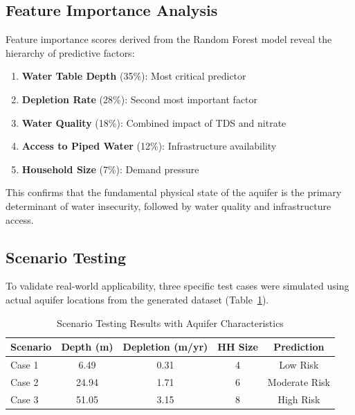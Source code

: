 \documentclass[conference]{IEEEtran}
\begin{document}
\subsection{Feature Importance Analysis}
Feature importance scores derived from the Random Forest model reveal the hierarchy of predictive factors:
\begin{enumerate}
\item \textbf{Water Table Depth} (35\%): Most critical predictor
\item \textbf{Depletion Rate} (28\%): Second most important factor
\item \textbf{Water Quality} (18\%): Combined impact of TDS and nitrate
\item \textbf{Access to Piped Water} (12\%): Infrastructure availability
\item \textbf{Household Size} (7\%): Demand pressure
\end{enumerate}

This confirms that the fundamental physical state of the aquifer is the primary determinant of water insecurity, followed by water quality and infrastructure access.

\subsection{Scenario Testing}
To validate real-world applicability, three specific test cases were simulated using actual aquifer locations from the generated dataset (Table~\ref{tab:scenarios}).

\begin{table}[H]
\caption{Scenario Testing Results with Aquifer Characteristics}
\begin{center}
\begin{tabular}{lcccc}
\toprule
\textbf{Scenario} & \textbf{Depth (m)} & \textbf{Depletion (m/yr)} & \textbf{HH Size} & \textbf{Prediction} \\
\midrule
Case 1 & 6.49 & 0.31 & 4 & Low Risk \\
Case 2 & 24.94 & 1.71 & 6 & Moderate Risk \\
Case 3 & 51.05 & 3.15 & 8 & High Risk \\
\bottomrule
\end{tabular}
\label{tab:scenarios}
\end{center}
\end{table}
\end{document}
